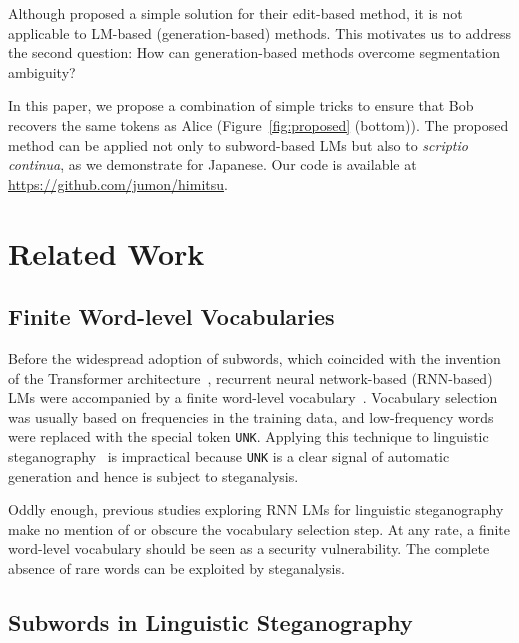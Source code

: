 \documentclass[11pt]{article}
\begin{document}
Although \citet{ueoka-etal-2021-frustratingly} proposed a simple solution for their edit-based method, it is not applicable to LM-based (generation-based) methods.
This motivates us to address the second question: How can generation-based methods overcome segmentation ambiguity?

In this paper, we propose a combination of simple tricks to ensure that Bob recovers the same tokens as Alice (Figure~\ref{fig:proposed} (bottom)).
The proposed method can be applied not only to subword-based LMs but also to \textit{scriptio continua}, as we demonstrate for Japanese.
Our code is available at \url{https://github.com/jumon/himitsu}.







\section{Related Work} \label{sec:related}
\subsection{Finite Word-level Vocabularies}
\label{sec:related-lm}
Before the widespread adoption of subwords, which coincided with the invention of the Transformer architecture~\citep{Vaswani:NIPS2017}, recurrent neural network-based (RNN-based) LMs were accompanied by a finite word-level vocabulary~\citep{Bengio:JMLR2003}.
Vocabulary selection was usually based on frequencies in the training data, and low-frequency words were replaced with the special token \texttt{UNK}.
Applying this technique to linguistic steganography~\citep{zhang-etal-2021-provably} is impractical because \texttt{UNK} is a clear signal of automatic generation and hence is subject to steganalysis.

Oddly enough, previous studies exploring RNN LMs for linguistic steganography~\citep{fang-etal-2017-generating,YangCCS2018,Yang:TIFS2019,Yang:DFW2020,Kang:EI2020,Yang:TIFS2021,Li:TDS2021,Zhou:TDSC2021} make no mention of or obscure the vocabulary selection step.
At any rate, a finite word-level vocabulary should be seen as a security vulnerability.
The complete absence of rare words can be exploited by steganalysis.

\subsection{Subwords in Linguistic Steganography} \label{sec:related-subwords}
\end{document}
